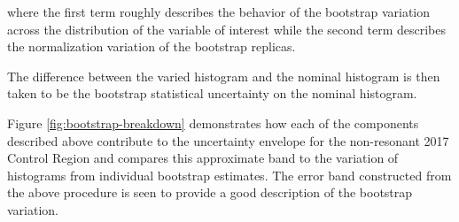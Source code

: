 where the first term roughly describes the behavior of the bootstrap variation across the distribution of 
the variable of interest while the second term describes the normalization variation of the bootstrap replicas.

The difference between the varied histogram and the nominal histogram is then
taken to be the bootstrap statistical uncertainty on the nominal histogram.

Figure \ref{fig:bootstrap-breakdown} demonstrates how each of the components described above
contribute to the uncertainty envelope for the non-resonant 2017 Control Region 
and compares this approximate band to the variation of histograms from individual bootstrap 
estimates. The error band constructed from the above procedure is seen to provide a good 
description of the bootstrap variation.

